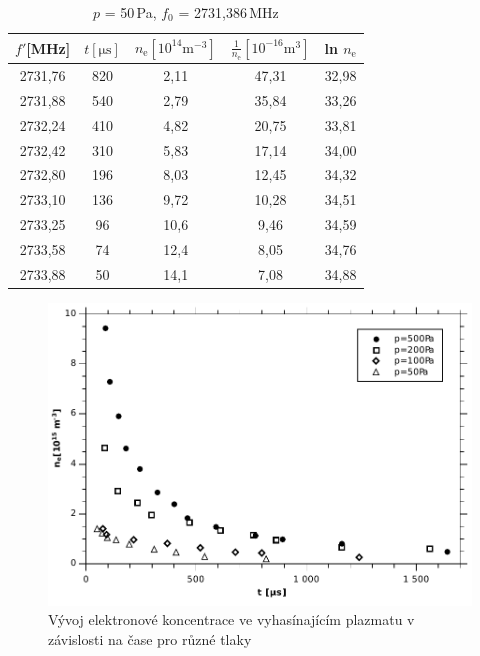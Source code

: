 \documentclass[12pt]{article}
\begin{document}
\begin{table}[htbp]
\begin{center}
\begin{tabular}{|c|c|c|c|c|}
\hline
$f'$[MHz] & $t[\mathrm{\mu s}]$ & $n_\mathrm{e}[10^{14}\mathrm{m}^{-3}]$ & $\frac{1}{n_\mathrm{e}} [10^{-16} \mathrm{m}^3]$ & ln $n_\mathrm{e}$ \\ \hline
2731,76 & 820 & 2,11 & 47,31 & 32,98 \\ \hline
2731,88 & 540 & 2,79 & 35,84 & 33,26 \\ \hline
2732,24 & 410 & 4,82 & 20,75 & 33,81 \\ \hline
2732,42 & 310 & 5,83 & 17,14 & 34,00 \\ \hline
2732,80 & 196 & 8,03 & 12,45 & 34,32 \\ \hline
2733,10 & 136 & 9,72 & 10,28 & 34,51 \\ \hline
2733,25 & 96 & 10,6 & 9,46 & 34,59 \\ \hline
2733,58 & 74 & 12,4 & 8,05 & 34,76 \\ \hline
2733,88 & 50 & 14,1 & 7,08 & 34,88 \\ \hline
\end{tabular}
\end{center}
\caption{$p$ = 50\,Pa, $f_0$ = 2731,386\,MHz}
\label{p50}
\end{table}

\begin{figure}[htbp]
\begin{center}
\includegraphics[width=13.5cm]{Graph1.pdf}
\caption{Vývoj elektronové koncentrace ve vyhasínajícím plazmatu v závislosti na čase pro různé tlaky}
\label{koncentrace}
\end{center}
\end{figure}
\end{document}
